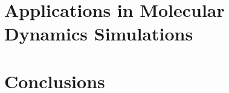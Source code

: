 \documentclass[a4paper]{ustthesis}
\begin{document}
\chapter{Applications in Molecular Dynamics Simulations}
\label{chp_applications}

\newpage

\chapter{Conclusions}
\label{chp_conclusion}

\newpage





\newpage
\end{document}
